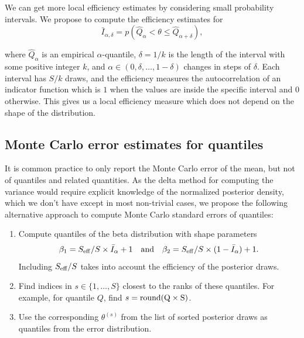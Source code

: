 \documentclass[american,]{article}
\begin{document}

We can get more local efficiency estimates by considering small
probability intervals. We propose to compute the efficiency estimates
for
\begin{equation}
\bar{I}_{\alpha,\delta} = p(\hat{Q}_\alpha < \theta \leq \hat{Q}_{\alpha+\delta}),
\end{equation}

where \(\hat{Q}_\alpha\) is an empirical \(\alpha\)-quantile,
\(\delta=1/k\) is the length of the interval with some positive integer
\(k\), and \(\alpha \in (0,\delta,\ldots,1-\delta)\) changes in steps of
\(\delta\). Each interval has \(S/k\) draws, and the efficiency measures
the autocorrelation of an indicator function which is \(1\) when the
values are inside the specific interval and \(0\) otherwise. This gives
us a local efficiency measure which does not depend on the shape of the
distribution.

\hypertarget{mcse}{%
\subsection{Monte Carlo error estimates for quantiles}\label{mcse}}

It is common practice to only report the Monte Carlo error of the mean,
but not of quantiles and related quantities. As the delta method for
computing the variance would require explicit knowledge of the
normalized posterior density, which we don't have except in most non-trivial
cases, we propose the following alternative approach to compute Monte
Carlo standard errors of quantiles:

\begin{enumerate}
\def\labelenumi{\arabic{enumi}.}
\item
  Compute quantiles of the beta distribution with shape parameters
  \begin{equation}
  \beta_1 = S_{\rm eff} / S \times \bar{I}_\alpha+1 \quad \text{and} \quad
  \beta_2 = S_{\rm eff} / S \times (1-\bar{I}_\alpha) + 1.
  \end{equation} Including \(S_{\rm eff}/S\) takes into account the
  efficiency of the posterior draws.
\item
  Find indices in \(s \in \{1,\ldots,S\}\) closest to the ranks of these
  quantiles. For example, for quantile \(Q\), find
  \(s = {\rm round(Q \times S)}\).
\item
  Use the corresponding \(\theta^{(s)}\) from the list of sorted
  posterior draws as quantiles from the error distribution. 
\end{enumerate}
\end{document}

